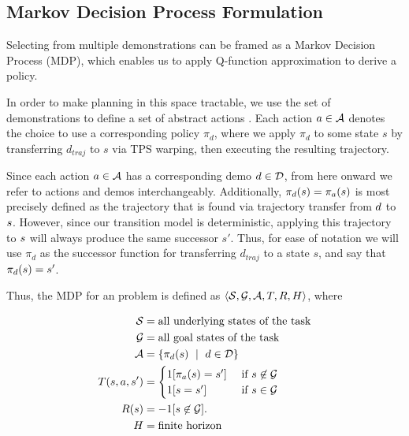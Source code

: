 \subsection{Markov Decision Process Formulation}
\label{subsec:form_mdp}

Selecting from multiple demonstrations can be framed as a Markov Decision
Process (MDP), which enables us to apply Q-function approximation to derive a
policy.

In order to make planning in this space tractable, we use the set of
demonstrations \demoset{} to define a set of abstract actions \actionset{}. Each
action $a \in \mathcal{A}$ denotes the choice to use a corresponding
policy $\pi_d$, where we apply $\pi_d$ to some state $s$ by transferring
$d_{traj}$ to $s$ via TPS warping, then executing the resulting trajectory.

Since each action $a \in \mathcal{A}$ has a corresponding demo $d
\in \mathcal{D}$, from here onward we refer to actions and demos
interchangeably. Additionally, $\pi_{d}(s) =
\pi_{a}(s)$ is most precisely defined as the trajectory that is
found via trajectory transfer from $d$ to $s$. However, since our
transition model is deterministic, applying this trajectory to $s$ will
always produce the same successor $s'$. Thus, for ease of notation we will use
$\pi_{d}$ as the successor function for transferring $d_{traj}$ to a state $s$,
and say that $\pi_{d}(s) = s'$.

Thus, the MDP for an \mmql{} problem is defined as
$\langle\mathcal{S},\mathcal{G},\mathcal{A},T,R,H\rangle$, where

\begin{equation}
\begin{aligned}
\stateset{} &=  \text{all underlying states of the task} \\
\goalset{} &=  \text{all goal states of the task} \\
\actionset{} &= \{\policysub{\demovar{}}{\statevar{}}\ \mid \text{ } \demovar{} \in \demoset{}\} \\
\transitionfn{}(\statevar{}, \actionvar{}, \nextstatevar{}) &=
    \begin{cases}
    1[\policysub{\actionvar{}}{\statevar{}} = \nextstatevar{}] &\text{ if } \statevar{} \not \in \goalset{} \\
    1[\statevar{} = \statevar{}'] &\text{ if } \statevar{} \in \goalset{}
    \end{cases}\\
\rewardfn{}(\statevar{}) &= -1 {[ \statevar{} \not \in \goalset{} ]}. \\
H &= \text{finite horizon}
\end{aligned}
\label{eq:mdp}
\end{equation}

